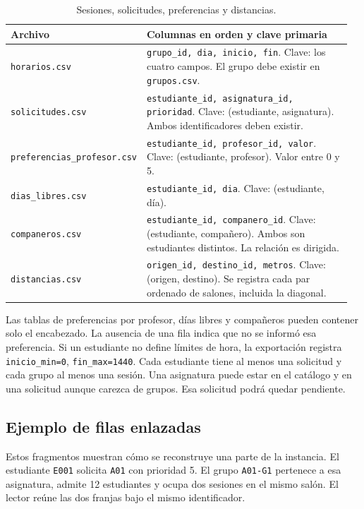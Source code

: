 \documentclass[11pt]{article}
\numberwithin{equation}{section}
\numberwithin{figure}{section}
\numberwithin{table}{section}
\theoremstyle{definition}
\begin{document}
\begin{table}[H]
\centering
\caption{Sesiones, solicitudes, preferencias y distancias.}
\small
\begin{tabular}{@{}p{0.27\linewidth}p{0.69\linewidth}@{}}
\toprule
\textbf{Archivo} & \textbf{Columnas en orden y clave primaria} \\
\midrule
\texttt{horarios.csv} &
\texttt{grupo\_id, dia, inicio, fin}. Clave: los cuatro campos.
El grupo debe existir en \texttt{grupos.csv}. \\
\texttt{solicitudes.csv} &
\texttt{estudiante\_id, asignatura\_id, prioridad}. Clave:
(estudiante, asignatura). Ambos identificadores deben existir. \\
\texttt{preferencias\_}\newline\texttt{profesor.csv} &
\texttt{estudiante\_id, profesor\_id, valor}. Clave:
(estudiante, profesor). Valor entre 0 y 5. \\
\texttt{dias\_libres.csv} &
\texttt{estudiante\_id, dia}. Clave: (estudiante, día). \\
\texttt{companeros.csv} &
\texttt{estudiante\_id, companero\_id}. Clave: (estudiante,
compañero). Ambos son estudiantes distintos. La relación es dirigida. \\
\texttt{distancias.csv} &
\texttt{origen\_id, destino\_id, metros}. Clave: (origen, destino).
Se registra cada par ordenado de salones, incluida la diagonal. \\
\bottomrule
\end{tabular}
\end{table}

Las tablas de preferencias por profesor, días libres y compañeros pueden
contener solo el encabezado. La ausencia de una fila indica que no se
informó esa preferencia. Si un estudiante no define límites de hora, la
exportación registra \texttt{inicio\_min=0}, \texttt{fin\_max=1440}.
Cada estudiante tiene al menos una solicitud y cada grupo al menos una
sesión. Una asignatura puede estar en el catálogo y en una solicitud aunque
carezca de grupos. Esa solicitud podrá quedar pendiente.

\subsection{Ejemplo de filas enlazadas}

Estos fragmentos muestran cómo se reconstruye una parte de la instancia.
El estudiante \texttt{E001} solicita \texttt{A01} con prioridad 5.
El grupo \texttt{A01-G1} pertenece a esa asignatura, admite 12 estudiantes y
ocupa dos sesiones en el mismo salón. El lector reúne las dos franjas bajo
el mismo identificador.
\end{document}

